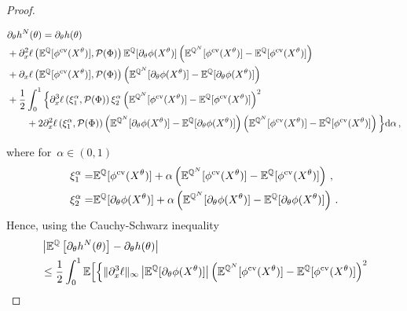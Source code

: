 \begin{proof}
\begin{small}
\begin{equation*}
\begin{split}
 	&\partial_{\theta}h^{N}(\theta) =  \partial_{\theta}h(\theta) \\ 
 	& + \partial_x^2 \ell\left(\mathbb{E}^{\mathbb{Q}}[\phi^{\textup{cv}}(X^{\theta})],\mathcal{P}(\Phi) \right) \mathbb{E}^{\mathbb{Q}}[\partial_\theta \phi(X^{\theta})]\left(\mathbb{E}^{\mathbb{Q}^N}[\phi^{\textup{cv}}(X^{\theta})]  - \mathbb{E}^{\mathbb{Q}}[\phi^{\textup{cv}}(X^{\theta})]  \right)  \\
        & + \partial_x \ell\left(\mathbb{E}^{\mathbb{Q}}[\phi^{\textup{cv}}(X^{\theta})],\mathcal{P}(\Phi) \right) \left( \mathbb{E}^{\mathbb{Q}^N}[\partial_\theta \phi(X^{\theta})]  - \mathbb{E}^{\mathbb{Q}}[\partial_\theta \phi(X^{\theta})]  \right) \\
        & + \frac{1}{2} \int_{0}^1 \Big\{\partial_x^3 \ell\left(\xi_1^{\alpha},\mathcal{P}(\Phi) \right) \xi_2^{\alpha}\left(\mathbb{E}^{\mathbb{Q}^N}[\phi^{\textup{cv}}(X^{\theta})]  - \mathbb{E}^{\mathbb{Q}}[\phi^{\textup{cv}}(X^{\theta})]  \right)^2 \\
        & \qquad + 2 \partial_x^2 \ell\left(\xi_1^{\alpha},\mathcal{P}(\Phi) \right) \left(\mathbb{E}^{\mathbb{Q}^N}[\partial_{\theta}\phi(X^{\theta})]  - \mathbb{E}^{\mathbb{Q}}[\partial_{\theta}\phi(X^{\theta})]  \right) \left(\mathbb{E}^{\mathbb{Q}^N}[\phi^{\textup{cv}}(X^{\theta})]  - \mathbb{E}^{\mathbb{Q}}[\phi^{\textup{cv}}(X^{\theta})]  \right)\Big\} \mathrm{d}\alpha\,,
\end{split}
\end{equation*}
\end{small}%
where for~$\alpha\in(0,1)$
 \[
 \begin{split}
 \xi_1^{\alpha} = &  \mathbb{E}^{\mathbb{Q}}[\phi^{\textup{cv}}(X^{\theta})]  + \alpha \left(
 \mathbb{E}^{\mathbb{Q}^N}[\phi^{\textup{cv}}(X^{\theta})] - \mathbb{E}^{\mathbb{Q}}[\phi^{\textup{cv}}(X^{\theta})] \right)\,, \\ 
  \xi_2^{\alpha} = &  \mathbb{E}^{\mathbb{Q}}[\partial_\theta \phi(X^{\theta})] + \alpha \left( \mathbb{E}^{\mathbb{Q}^N}[\partial_\theta \phi(X^{\theta})] - \mathbb{E}^{\mathbb{Q}}[\partial_\theta \phi(X^{\theta})] \right)\,.
 \end{split}
 \]
 Hence, using the Cauchy-Schwarz inequality 
 \[
 \begin{split}
 	&\left| \EE^{\QQ}\left[\partial_{\theta} h^{N}(\theta)\right] -  \partial_{\theta}h(\theta) \right|\\ 
 	 & \leq \frac{1}{2} \int_{0}^1 \EE \Big[ \Big\{ \| \partial_x^3 \ell\|_{\infty} \left| \EE^{\QQ}[\partial_\theta \phi(X^{\theta})]\right| \left(\EE^{\QQ^N}[\phi^{\textup{cv}}(X^{\theta})]  - \EE^{\QQ}[\phi^{\textup{cv}}(X^{\theta})]  \right)^2 \\

\end{split}\]
\end{proof}

